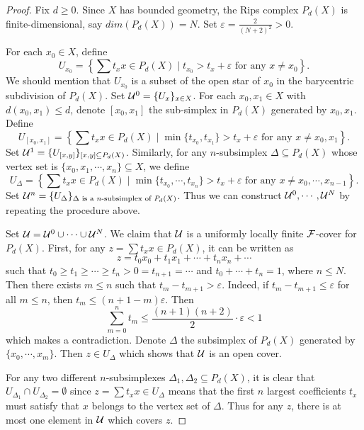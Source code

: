 \documentclass[11pt]{article}
\theoremstyle{definition}
\theoremstyle{plain}
\begin{document}
\begin{proof}
Fix $d\geq 0$. Since $X$ has bounded geometry, the Rips complex $P_d(X)$ is finite-dimensional, say $dim(P_d(X))=N$. Set $\varepsilon=\frac 2{(N+2)^2}>0$.

For each $x_0\in X$, define
$$U_{x_0}=\left\{\sum t_xx\in P_d(X)\mid t_{x_0}>t_x+\varepsilon\text{ for any }x\ne x_0\right\}.$$
We should mention that $U_{x_0}$ is a subset of the open star of $x_0$ in the barycentric subdivision of $P_d(X)$. Set $\mathcal U^0=\{U_x\}_{x\in X}$. For each $x_0,x_1\in X$ with $d(x_0,x_1)\leq d$, denote $[x_0,x_1]$ the sub-simplex in $P_d(X)$ generated by $x_0,x_1$. Define
$$U_{[x_0,x_1]}=\left\{\sum t_xx\in P_d(X)\mid \min\{t_{x_0},t_{x_1}\}>t_x+\varepsilon\text{ for any }x\ne x_0,x_1 \right\}.$$
Set $\mathcal U^1=\{U_{[x,y]}\}_{[x,y]\subseteq P_d(X)}$. Similarly, for any $n$-subsimplex $\Delta\subseteq P_d(X)$ whose vertex set is $\{x_0,x_1,\cdots,x_n\}\subseteq X$, we define
$$U_{\Delta}=\left\{\sum t_xx\in P_d(X)\mid \min\{t_{x_0},\cdots,t_{x_n}\}>t_x+\varepsilon\text{ for any }x\ne x_0,\cdots,x_{n-1} \right\}.$$
Set $\mathcal U^n=\{U_{\Delta}\}_{\Delta\text{ is a $n$-subsimplex of }P_d(X)}$.  Thus we can construct $\mathcal U^0,\cdots,\mathcal U^N$ by repeating the procedure above.

Set $\mathcal U=\mathcal U^0\cup\cdots\cup\mathcal U^N$. We claim that $\mathcal U$ is a uniformly locally finite $\mathcal F$-cover for $P_d(X)$. First, for any $z=\sum t_xx\in P_d(X)$, it can be written as
$$z=t_0x_0+t_1x_1+\cdots+t_nx_n+\cdots$$
such that $t_0\geq t_1\geq \cdots\geq t_n> 0=t_{n+1}=\cdots$ and $t_0+\cdots+t_n=1$, where $n\leq N$. Then there exists $m\leq n$ such that $t_m-t_{m+1}>\varepsilon$. Indeed, if $t_m-t_{m+1}\leq\varepsilon$ for all $m\leq n$, then $t_m\leq(n+1-m)\varepsilon$. Then
$$\sum_{m=0}^{n}t_m\leq \frac{(n+1)(n+2)}2\cdot\varepsilon<1$$
which makes a contradiction. Denote $\Delta$ the subsimplex of $P_d(X)$ generated by $\{x_0,\cdots,x_m\}$. Then $z\in U_{\Delta}$ which shows that $\mathcal U$ is an open cover.

 For any two different $n$-subsimplexes $\Delta_1,\Delta_2\subseteq P_d(X)$, it is clear that $U_{\Delta_1}\cap U_{\Delta_2}=\emptyset$ since $z=\sum t_xx\in U_{\Delta}$ means that the first $n$ largest coefficients $t_x$ must satisfy that $x$ belongs to the vertex set of $\Delta$. Thus for any $z$, there is at most one element in $\mathcal U$ which covers $z$.


\end{proof}
\end{document}
